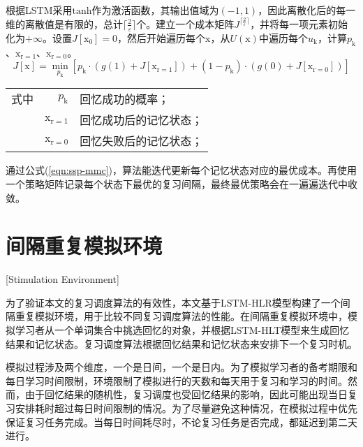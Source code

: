 根据LSTM采用$\mathrm{tanh}$作为激活函数，其输出值域为$(-1,1)$，因此离散化后的每一维的离散值是有限的，总计$\lceil\frac{2}{\varepsilon}\rceil$个。建立一个成本矩阵$J^{\lceil\frac{2}{\varepsilon}\rceil}$，并将每一项元素初始化为$+\infty$。设置$J[\bm{\mathrm{x_0}}] = 0$，然后开始遍历每个$\bm{\mathrm{x}}$，从$U(\bm{\mathrm{x}})$中遍历每个$u_\mathrm{k}$，计算$p_\mathrm{k}$、$\bm{\mathrm{x}}_\mathrm{r=1}$、$\bm{\mathrm{x}}_\mathrm{r=0}$。
\begin{equation}
\label{eqn:ssp-mmc}
J[\bm{\mathrm{x}}] = \min\limits_{p_\mathrm{k}} [p_\mathrm{k} \cdot (g(1) + J[\bm{\mathrm{x}}_\mathrm{r=1}]) + (1-p_\mathrm{k}) \cdot (g(0) + J[\bm{\mathrm{x}}_\mathrm{r=0}])]
\end{equation}
\begin{tabularx}{\textwidth}{@{}l@{\quad}r@{———}X@{}}
    式中&  $p_\mathrm{k}$ &回忆成功的概率；\\
    &  $\bm{\mathrm{x}}_\mathrm{r=1}$ &回忆成功后的记忆状态；\\
    &  $\bm{\mathrm{x}}_\mathrm{r=0}$ &回忆失败后的记忆状态；
\end{tabularx}\vspace{3.15bp}

通过公式(\ref{eqn:ssp-mmc})，算法能迭代更新每个记忆状态对应的最优成本。再使用一个策略矩阵记录每个状态下最优的复习间隔，最终最优策略会在一遍遍迭代中收敛。

\section{间隔重复模拟环境}[Stimulation Environment]

为了验证本文的复习调度算法的有效性，本文基于LSTM-HLR模型构建了一个间隔重复模拟环境，用于比较不同复习调度算法的性能。在间隔重复模拟环境中，模拟学习者从一个单词集合中挑选回忆的对象，并根据LSTM-HLT模型来生成回忆结果和记忆状态。复习调度算法根据回忆结果和记忆状态来安排下一个复习时机。

模拟过程涉及两个维度，一个是日间，一个是日内。为了模拟学习者的备考期限和每日学习时间限制，环境限制了模拟进行的天数和每天用于复习和学习的时间。然而，由于回忆结果的随机性，复习调度也受回忆结果的影响，因此可能出现当日复习安排耗时超过每日时间限制的情况。为了尽量避免这种情况，在模拟过程中优先保证复习任务完成。当每日时间耗尽时，不论复习任务是否完成，都延迟到第二天进行。

